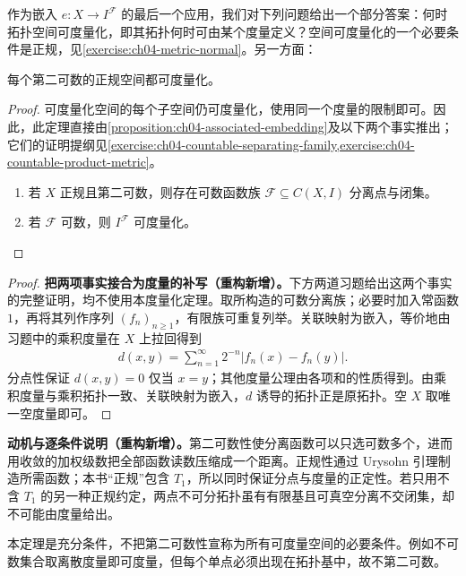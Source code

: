 \documentclass[../../main.tex]{subfiles}
\begin{document}
作为嵌入 $e:X\to I^{\mathcal F}$ 的最后一个应用，我们对下列问题给出一个部分答案：何时拓扑空间可度量化，即其拓扑何时可由某个度量定义？空间可度量化的一个必要条件是正规，见\cref{exercise:ch04-metric-normal}。另一方面：
\begin{theorem}\label{theorem:ch04-urysohn-metrization}
每个第二可数的正规空间都可度量化。
\end{theorem}
\begin{proof}
可度量化空间的每个子空间仍可度量化，使用同一个度量的限制即可。因此，此定理直接由\cref{proposition:ch04-associated-embedding}及以下两个事实推出；它们的证明提纲见\cref{exercise:ch04-countable-separating-family,exercise:ch04-countable-product-metric}。
\begin{enumerate}
\item 若 $X$ 正规且第二可数，则存在可数函数族 $\mathcal F\subseteq C(X,I)$ 分离点与闭集。
\item 若 $\mathcal F$ 可数，则 $I^{\mathcal F}$ 可度量化。
\end{enumerate}
\end{proof}
\begin{proof}
\textbf{把两项事实接合为度量的补写（重构新增）。}下方两道习题给出这两个事实的完整证明，均不使用本度量化定理。取所构造的可数分离族；必要时加入常函数 $1$，再将其列作序列 $(f_n)_{n\ge1}$，有限族可重复列举。关联映射为嵌入，等价地由习题中的乘积度量在 $X$ 上拉回得到
\begin{align*}
d(x,y)=\sum_{n=1}^{\infty}2^{-n}|f_n(x)-f_n(y)|.
\end{align*}
分点性保证 $d(x,y)=0$ 仅当 $x=y$；其他度量公理由各项和的性质得到。由乘积度量与乘积拓扑一致、关联映射为嵌入，$d$ 诱导的拓扑正是原拓扑。空 $X$ 取唯一空度量即可。
\end{proof}
\begin{remark}
\textbf{动机与逐条件说明（重构新增）。}第二可数性使分离函数可以只选可数多个，进而用收敛的加权级数把全部函数读数压缩成一个距离。正规性通过 Urysohn 引理制造所需函数；本书“正规”包含 $T_1$，所以同时保证分点与度量的正定性。若只用不含 $T_1$ 的另一种正规约定，两点不可分拓扑虽有有限基且可真空分离不交闭集，却不可能由度量给出。

本定理是充分条件，不把第二可数性宣称为所有可度量空间的必要条件。例如不可数集合取离散度量即可度量，但每个单点必须出现在拓扑基中，故不第二可数。
\end{remark}
\end{document}
